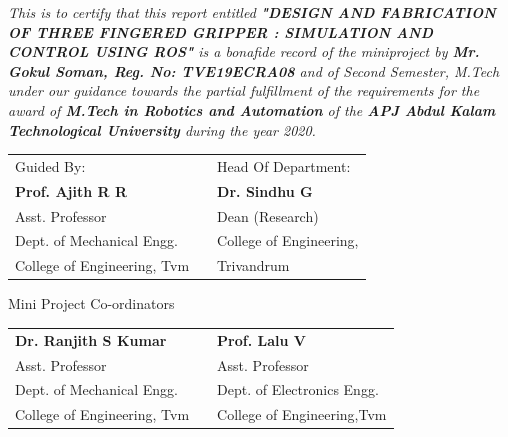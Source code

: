 \documentclass[a4paper,12pt,one side]{report}%
\begin{document}
\textit {   This is to certify that this report entitled \textbf{"DESIGN AND FABRICATION OF THREE FINGERED GRIPPER : SIMULATION AND CONTROL USING ROS"} is a bonafide record of the miniproject by  \textbf{Mr. Gokul Soman, Reg. No: TVE19ECRA08} and of Second Semester, M.Tech under our guidance towards the partial fulfillment of the requirements for the award of \textbf{M.Tech in Robotics and Automation} of the \textbf{APJ Abdul Kalam Technological University }during the year 2020.}

\begin{singlespace}
\begin{center}
\begin{tabular}{ p{6cm} p{2cm} p{6cm} }
Guided By:& &Head Of Department:\\
\vspace{0.02cm}\textbf{Prof. Ajith R R }& &\vspace{0.02cm}\textbf{Dr. Sindhu G} \\ 
Asst. Professor& &Dean (Research) \\
Dept. of Mechanical Engg. & &College of Engineering,\\
College of Engineering, Tvm & &Trivandrum \\ 
\end{tabular}
\end{center}
\vspace{0.1cm}
\begin{center}
Mini Project Co-ordinators\\\vspace{0.1cm}
\begin{tabular}{ p{6cm} p{2cm} p{6cm} } 
\textbf{Dr. Ranjith S Kumar}&&\textbf{Prof. Lalu V} \\ 
Asst. Professor&&Asst. Professor\\ 
Dept. of Mechanical Engg.&&Dept. of Electronics Engg.\\ 
College of Engineering, Tvm && College of Engineering,Tvm\\
\end{tabular}
\end{center}

\end{singlespace}
\newpage
%
%
\thispagestyle{empty}
\end{document}

